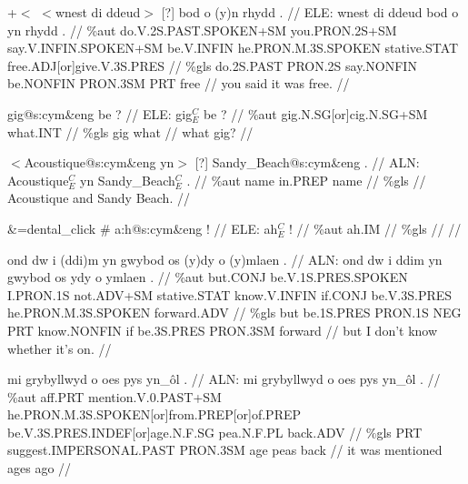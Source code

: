 \documentclass[a4paper,10pt]{article}
\begin{document}
\ex
\begingl[lingstyle=gergl]
\glchat +$<$ $<$wnest di ddeud$>$ [?] bod o (y)n rhydd . //
\glsurface ELE:  wnest di ddeud bod o yn rhydd .  //
\glauto \%aut  do{\scriptsize .V.2S.PAST.SPOKEN+SM} you{\scriptsize .PRON.2S+SM} say{\scriptsize .V.INFIN.SPOKEN+SM} be{\scriptsize .V.INFIN} he{\scriptsize .PRON.M.3S.SPOKEN} stative{\scriptsize .STAT} free{\scriptsize .ADJ[or]give.V.3S.PRES}   //
\glmanual \%gls  do{\scriptsize .2S.PAST} PRON{\scriptsize .2S} say{\scriptsize .NONFIN} be{\scriptsize .NONFIN} PRON{\scriptsize .3SM} PRT free   //
\gleng you said it was free. //
\endgl
\xe

\ex
\begingl[lingstyle=gergl]
\glchat gig@s:cym\&eng be ? //
\glsurface ELE:  gig$^{C}_{E}$ be ?  //
\glauto \%aut  gig{\scriptsize .N.SG[or]cig.N.SG+SM} what{\scriptsize .INT}   //
\glmanual \%gls  gig what   //
\gleng what gig? //
\endgl
\xe

\ex
\begingl[lingstyle=gergl]
\glchat $<$Acoustique@s:cym\&eng yn$>$ [?] Sandy\_Beach@s:cym\&eng . //
\glsurface ALN:  Acoustique$^{C}_{E}$ yn Sandy\_Beach$^{C}_{E}$ .  //
\glauto \%aut  name in{\scriptsize .PREP} name   //
\glmanual \%gls       //
\gleng Acoustique and Sandy Beach. //
\endgl
\xe

\ex
\begingl[lingstyle=gergl]
\glchat \&=dental\_click \# a:h@s:cym\&eng ! //
\glsurface ELE:  ah$^{C}_{E}$ !  //
\glauto \%aut  ah{\scriptsize .IM}   //
\glmanual \%gls     //
\gleng  //
\endgl
\xe

\ex
\begingl[lingstyle=gergl]
\glchat ond dw i (ddi)m yn gwybod os (y)dy o (y)mlaen . //
\glsurface ALN:  ond dw i ddim yn gwybod os ydy o ymlaen .  //
\glauto \%aut  but{\scriptsize .CONJ} be{\scriptsize .V.1S.PRES.SPOKEN} I{\scriptsize .PRON.1S} not{\scriptsize .ADV+SM} stative{\scriptsize .STAT} know{\scriptsize .V.INFIN} if{\scriptsize .CONJ} be{\scriptsize .V.3S.PRES} he{\scriptsize .PRON.M.3S.SPOKEN} forward{\scriptsize .ADV}   //
\glmanual \%gls  but be{\scriptsize .1S.PRES} PRON{\scriptsize .1S} NEG PRT know{\scriptsize .NONFIN} if be{\scriptsize .3S.PRES} PRON{\scriptsize .3SM} forward   //
\gleng but I don't know whether it's on. //
\endgl
\xe

\ex
\begingl[lingstyle=gergl]
\glchat mi grybyllwyd o oes pys yn\_ôl . //
\glsurface ALN:  mi grybyllwyd o oes pys yn\_ôl .  //
\glauto \%aut  aff{\scriptsize .PRT} mention{\scriptsize .V.0.PAST+SM} he{\scriptsize .PRON.M.3S.SPOKEN[or]from.PREP[or]of.PREP} be{\scriptsize .V.3S.PRES.INDEF[or]age.N.F.SG} pea{\scriptsize .N.F.PL} back{\scriptsize .ADV}   //
\glmanual \%gls  PRT suggest{\scriptsize .IMPERSONAL.PAST} PRON{\scriptsize .3SM} age peas back   //
\gleng it was mentioned ages ago //
\endgl
\xe
\end{document}
